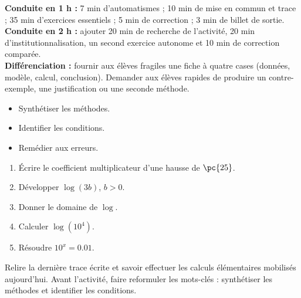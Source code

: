 \ifmxteacher
\begin{method}
\textbf{Conduite en 1 h :} 7 min d'automatismes ; 10 min de mise en commun et trace ; 35 min d'exercices essentiels ; 5 min de correction ; 3 min de billet de sortie.\\
\textbf{Conduite en 2 h :} ajouter 20 min de recherche de l'activité, 20 min d'institutionnalisation, un second exercice autonome et 10 min de correction comparée.\\
\textbf{Différenciation :} fournir aux élèves fragiles une fiche à quatre cases (données, modèle, calcul, conclusion). Demander aux élèves rapides de produire un contre-exemple, une justification ou une seconde méthode.
\end{method}
\fi
{}
\begin{objectives}\begin{itemize}\item Synthétiser les méthodes.\item Identifier les conditions.\item Remédier aux erreurs.\end{itemize}\end{objectives}
\begin{fluency}\begin{enumerate}\item Écrire le coefficient multiplicateur d'une hausse de $\pc{25}$. \item Développer $\log(3b)$, $b>0$. \item Donner le domaine de $\log$. \mxblank{$]0,+\infty[$}\item Calculer $\log(10^4)$. \item Résoudre $10^x=\num{0,01}$. \end{enumerate}\end{fluency}
\begin{prerequisites}Relire la dernière trace écrite et savoir effectuer les calculs élémentaires mobilisés aujourd'hui. Avant l'activité, faire reformuler les mots-clés : synthétiser les méthodes et identifier les conditions.\end{prerequisites}

